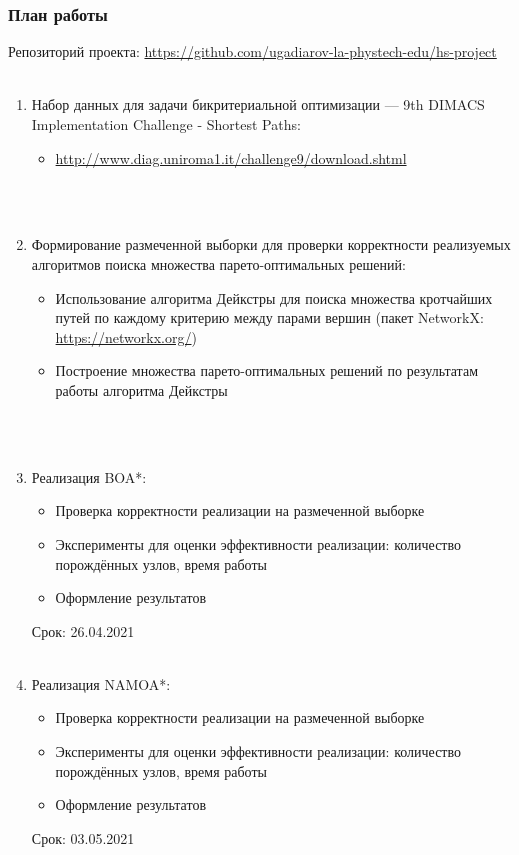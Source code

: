 \documentclass[aspectratio=169,8pt]{beamer}
\begin{document}
\begin{frame}
\frametitle{План работы}
Репозиторий проекта: \url{https://github.com/ugadiarov-la-phystech-edu/hs-project}\\ \ \\
\begin{enumerate}
\item Набор данных для задачи бикритериальной оптимизации --- 9th DIMACS Implementation Challenge - Shortest Paths:
\begin{itemize}
\item \url{http://www.diag.uniroma1.it/challenge9/download.shtml}
\end{itemize}
\ \\ \ \\
\item Формирование размеченной выборки для проверки корректности реализуемых алгоритмов поиска множества парето-оптимальных решений:
\begin{itemize}
\item Использование алгоритма Дейкстры для поиска множества кротчайших путей по каждому критерию между парами вершин (пакет NetworkX: \url{https://networkx.org/})
\item Построение множества парето-оптимальных решений по результатам работы алгоритма Дейкстры
\end{itemize}
\ \\ \ \\
\item Реализация BOA*:
\begin{itemize}
\item Проверка корректности реализации на размеченной выборке
\item Эксперименты для оценки эффективности реализации: количество порождённых узлов, время работы
\item Оформление результатов
\end{itemize}
Срок: 26.04.2021
\ \\ \ \\
\item Реализация NAMOA*:
\begin{itemize}
\item Проверка корректности реализации на размеченной выборке
\item Эксперименты для оценки эффективности реализации: количество порождённых узлов, время работы
\item Оформление результатов
\end{itemize}
Срок: 03.05.2021
\end{enumerate}
\end{frame}
\end{document}
